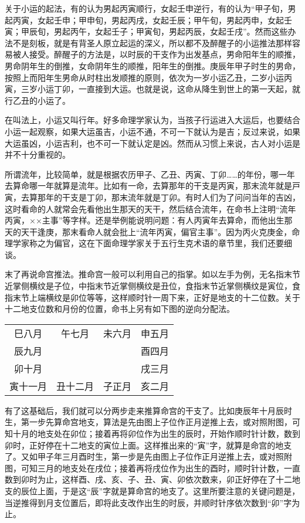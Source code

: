 \documentclass[a5paper,oneside,12pt]{ctexbook}
\begin{document}
关于小运的起法，有的认为男起丙寅顺行，女起壬申逆行，有的认为“甲子旬，男起丙寅，女起壬申；甲申旬，男起丙戌，女起壬辰；甲午旬，男起丙申，女起壬寅；甲辰旬，男起丙午，女起壬子；甲寅旬，男起丙辰，女起壬戌”。然而这些办法不是刻板，就是有背圣人原立起运的深义，所以都不及醉醒子的小运推法那样容易被人接受。醉醒子的方法是，以时辰的干支作为出发基点，男命阳年生的顺推，男命阴年生的倒推，女命阴年生的顺推，阳年生的倒推。庚辰年甲子时生的男命，按照上而阳年生男命从时柱出发顺推的原则，依次为一岁小运乙丑，二岁小运丙寅，三岁小运丁卯，一直接到大运。也就是说，这命从降生到世上的第一天起，就行乙丑的小运了。	

在叫法上，小运又叫行年。好多命理学家认为，当孩子行运进入大运后，也要结合小运一起观察，如果大运虽吉，小运不通，不可一下就认为是吉；反过来说，如果大运虽凶，小运吉利，也不可一下就认定是凶。然而从习惯上来说，古人对小运是并不十分重视的。

所谓流年，比较简单，就是根据农历甲子、乙丑、丙寅、丁卯……的年份，哪一年去算命哪一年就算是流年。比如有一命，去算那年的干支是丙寅，那末流年就是戸寅，去算那年的干支是丁卯，那末流年就是丁卯。有时人们为了问问当年的吉凶，这时看命的人就常会先看他出生那天的天干，然后结合流年，在命书上注明“流年丙寅，××主事”等字样。还是举例能说明问题：有人丙寅年去算命，而他出生那天的天干逢庚，那末看命人就会批上“流年丙寅，偏官主事”。因为丙火克庚金，命理学家称之为偏官，这在下面命理学家关于五行生克术语的章节里，我们还要细谈。

末了再说命宫推法。推命宫一般可以利用自己的指掌。如以左手为例，无名指末节近掌侧横纹是子位，中指末节近掌侧横纹是丑位，食指末节近掌侧横纹是寅位，食指末节上端横纹是卯位等等，这样顺时针一周下来，正好是地支的十二位数。关于十二地支位数和月份的位置，命书上另有如下图的逆向分配法。

\begin{table}[H]
\centering
\begin{tabular}{cccc}
\large{巳}\footnotesize{八月}&\large{午}\footnotesize{七月}&\large{未}\footnotesize{六月}&\large{申}\footnotesize{五月}\\
\large{辰}\footnotesize{九月}&&&\large{酉}\footnotesize{四月}\\
\large{卯}\footnotesize{十月}&&&\large{戌}\footnotesize{三月}\\
\large{寅}\footnotesize{十一月}&\large{丑}\footnotesize{十二月}&\large{子}\footnotesize{正月}&\large{亥}\footnotesize{二月}\\
\end{tabular}   
\end{table}


有了这基础后，我们就可以分两步走来推算命宫的干支了。比如庚辰年十月辰时生，第一步先算命宫地支，算法是先由图上子位作正月逆推上去，或对照附图，可知十月的地支处在卯位；接着再将卯位作为出生的辰时，开始作顺时针计数，数到卯时，正好停在十二地支的寅位上面。这样推出来的“寅”字，就算是命宫的地支了。又如甲子年三月酉时生，第一步是先由图上子位作正月逆推上去，或对照附图，可知三月的地支处在戌位；接着再将戌位作为出生的酉时，顺时针计数，一直数到卯时为止，这样酉、戌、亥、子、丑、寅、卯依次数来，卯正好停在了十二地支的辰位上面，于是这“辰”字就是算命宫的地支了。这里所要注意的关键问题是，当逆推得到月支位置后，即将此支改作出生的时辰，并顺时针序依次数到“卯”字为止。
\end{document}
